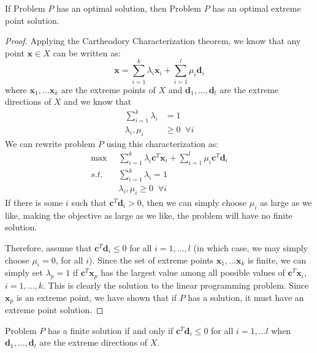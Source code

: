 \begin{theorem} If Problem $P$ has an optimal solution, then Problem $P$ has an optimal extreme point solution.
\label{thm:EPSoln}
\end{theorem}
\begin{proof} Applying the Cartheodory Characterization theorem, we know that any point $\mathbf{x} \in X$ can be written as:
\begin{equation}
\mathbf{x} = \sum_{i=1}^k\lambda_i\mathbf{x}_i + \sum_{i=1}^l\mu_i\mathbf{d}_i
\end{equation}
where $\mathbf{x}_1,\dots\mathbf{x}_k$ are the extreme  points of $X$ and $\mathbf{d}_1,\dots,\mathbf{d}_l$ are the extreme directions of $X$ and we know that 
\begin{equation}
\begin{aligned}
\sum_{i=1}^{k}\lambda_i & = 1\\
\lambda_i, \mu_i & \geq 0\;\;\forall i
\end{aligned}
\end{equation}
We can rewrite problem $P$ using this characterization as:
\begin{equation}
\begin{aligned}
\max\;\;& \sum_{i=1}^k\lambda_i\mathbf{c}^T\mathbf{x}_i + \sum_{i=1}^l\mu_i\mathbf{c}^T\mathbf{d}_i\\
s.t.\;\; & \sum_{i=1}^{k}\lambda_i = 1\\
&\lambda_i, \mu_i \geq 0\;\;\forall i
\end{aligned}
\end{equation}
If there is some $i$ such that $\mathbf{c}^T\mathbf{d}_i > 0$, then we can simply choose $\mu_i$ as large as we like, making the objective as large as we like, the problem will have no finite solution. 

Therefore, assume that $\mathbf{c}^T\mathbf{d}_i \leq 0$ for all $i=1,\dots,l$ (in which case, we may simply choose $\mu_i = 0$, for all $i$). Since the set of extreme points $\mathbf{x}_1,\dots\mathbf{x}_k$ is finite, we can simply set $\lambda_p = 1$ if $\mathbf{c}^T\mathbf{x}_p$ has the largest value among all possible values of $\mathbf{c}^T\mathbf{x}_i$, $i=1,\dots,k$. This is clearly the solution to the linear programming problem. Since $\mathbf{x}_p$ is an extreme point, we have shown that if $P$ has a solution, it must have an extreme point solution. 
\end{proof}
\begin{corollary} Problem $P$ has a finite solution if and only if $\mathbf{c}^T\mathbf{d}_i \leq 0$ for all $i=1,\dots l$ when $\mathbf{d}_1,\dots,\mathbf{d}_l$ are the extreme directions of $X$.
\label{cor:OptimalityDirections}
\end{corollary}
